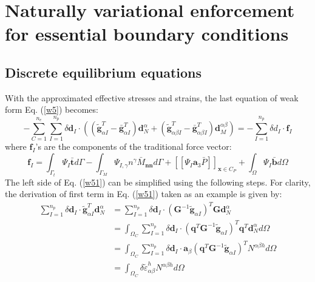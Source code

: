 \section{Naturally variational enforcement for essential boundary conditions}\label{boundary}
\subsection{Discrete equilibrium equations}
With the approximated effective stresses and strains, the last equation of weak form Eq. (\ref{w5}) becomes:
\begin{equation}\label{w51}
- \sum_{C=1}^{n_e}\sum_{I=1}^{n_p} \delta \boldsymbol d_I \cdot \left ( (\tilde{\boldsymbol g}^T_{\alpha I} - \bar{\boldsymbol g}^T_{\alpha I}) \boldsymbol d_N^{\alpha}
+ (\tilde{\boldsymbol g}^T_{\alpha\beta I} - \bar{\boldsymbol g}^T_{\alpha\beta I}) \boldsymbol d_M^{\alpha\beta} \right ) = - \sum_{I=1}^{n_p}\delta d_I \cdot \boldsymbol f_I
\end{equation}
where $\boldsymbol f_I$'s are the components of the traditional force vector:
\begin{equation}
        \boldsymbol f_I = \int_{\Gamma_t} \Psi_I \bar{\boldsymbol t} d\Gamma - \int_{\Gamma_M} \Psi_{I,\gamma} n^\gamma \bar M_{\boldsymbol{nn}} d\Gamma + [[\Psi_I\boldsymbol a_3 \bar P]]_{\boldsymbol x\in C_P} + \int_\Omega \Psi_I \bar{\boldsymbol b} d\Omega
\end{equation}
The left side of Eq. (\ref{w51}) can be simplified using the following steps. For clarity, the derivation of first term in Eq. (\ref{w51}) taken as an example is given by:
\begin{equation}
\begin{split}
\sum_{I=1}^{n_p} \delta \boldsymbol d_I \cdot \tilde{\boldsymbol g}^T_{\alpha I} \boldsymbol d_N^\alpha 
&= \sum_{I=1}^{n_p} \delta \boldsymbol d_I \cdot (\boldsymbol G^{-1} \tilde{\boldsymbol g}_{\alpha I})^T  \boldsymbol G \boldsymbol d^\alpha_N \\
&= \int_{\Omega_C} \sum_{I=1}^{n_p} \delta \boldsymbol d_I \cdot (\boldsymbol q^T\boldsymbol G^{-1} \tilde{\boldsymbol g}_{\alpha I})^T  \boldsymbol q^T \boldsymbol d^\alpha_N d\Omega \\
&= \int_{\Omega_C} \sum_{I=1}^{n_p} \delta \boldsymbol d_I \cdot \boldsymbol a_\beta(\boldsymbol q^T\boldsymbol G^{-1} \tilde{\boldsymbol g}_{\alpha I})^T  N^{\alpha\beta h} d\Omega \\
& = \int_{\Omega_C} \delta \tilde \varepsilon_{\alpha\beta}^h N^{\alpha\beta h} d\Omega 
\end{split}
\end{equation}
